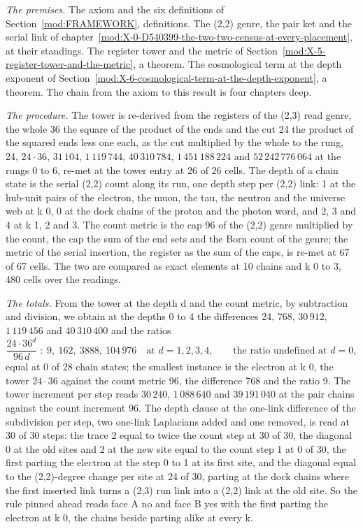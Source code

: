\begin{chproof}
\textit{The premises.} The axiom and the six definitions of Section~\ref{mod:FRAMEWORK}, definitions. The (2,2) genre, the pair ket and the serial link of chapter~\ref{mod:X-0-D540399-the-two-two-census-at-every-placement}, at their standings. The register tower and the metric of Section~\ref{mod:X-5-register-tower-and-the-metric}, a theorem. The cosmological term at the depth exponent of Section~\ref{mod:X-6-cosmological-term-at-the-depth-exponent}, a theorem. The chain from the axiom to this result is four chapters deep.

\textit{The procedure.} The tower is re-derived from the registers of the (2,3) read genre, the whole 36 the square of the product of the ends and the cut 24 the product of the squared ends less one each, as the cut multiplied by the whole to the rung, 24, $24\cdot 36$, $31\,104$, $1\,119\,744$, $40\,310\,784$, $1\,451\,188\,224$ and $52\,242\,776\,064$ at the rungs 0 to 6, re-met at the tower entry at 26 of 26 cells. The depth of a chain state is the serial (2,2) count along its run, one depth step per (2,2) link: 1 at the hub-unit pairs of the electron, the muon, the tau, the neutron and the universe web at k 0, 0 at the dock chains of the proton and the photon word, and 2, 3 and 4 at k 1, 2 and 3. The count metric is the cap 96 of the (2,2) genre multiplied by the count, the cap the sum of the end sets and the Born count of the genre; the metric of the serial insertion, the register as the sum of the caps, is re-met at 67 of 67 cells. The two are compared as exact elements at 10 chains and k 0 to 3, 480 cells over the readings.

\textit{The totals.} From the tower at the depth d and the count metric, by subtraction and division, we obtain at the depths 0 to 4 the differences 24, 768, $30\,912$, $1\,119\,456$ and $40\,310\,400$ and the ratios
\begin{equation}
\frac{24\cdot 36^{d}}{96\, d} \;:\; 9,\ 162,\ 3888,\ 104\,976 \quad\text{at } d = 1, 2, 3, 4,\qquad \text{the ratio undefined at } d = 0,
\end{equation}
equal at 0 of 28 chain states; the smallest instance is the electron at k 0, the tower $24\cdot 36$ against the count metric 96, the difference 768 and the ratio 9. The tower increment per step reads $30\,240$, $1\,088\,640$ and $39\,191\,040$ at the pair chains against the count increment 96. The depth clause at the one-link difference of the subdivision per step, two one-link Laplacians added and one removed, is read at 30 of 30 steps: the trace 2 equal to twice the count step at 30 of 30, the diagonal 0 at the old sites and 2 at the new site equal to the count step 1 at 0 of 30, the first parting the electron at the step 0 to 1 at its first site, and the diagonal equal to the (2,2)-degree change per site at 24 of 30, parting at the dock chains where the first inserted link turns a (2,3) run link into a (2,2) link at the old site. So the rule pinned ahead reads face A no and face B yes with the first parting the electron at k 0, the chains beside parting alike at every k.


\end{chproof}
